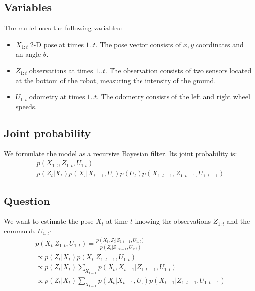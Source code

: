 \documentclass[letterpaper, 10pt, conference]{ieeeconf}
\begin{document}
\subsection{Variables}

The model uses the following variables:
\begin{itemize}
\item $X_{1:t}$ 2-D pose at times $1..t$.
The pose vector consists of $x,y$ coordinates and an angle $\theta$.
\item $Z_{1:t}$ observations at times $1..t$.
The observation consists of two sensors located at the bottom of the robot, measuring the intensity of the ground.
\item $U_{1:t}$ odometry at times $1..t$.
The odometry consists of the left and right wheel speeds.
\end{itemize}

\subsection{Joint probability}

We formulate the model as a recursive Bayesian filter.
Its joint probability is:
\begin{equation}
\begin{split}
& p(X_{1:t}, Z_{1:t}, U_{1:t}) = \\
& p(Z_t|X_t) p(X_t|X_{t-1}, U_{t}) p(U_t) p(X_{1:t-1}, Z_{1:t-1}, U_{1:t-1})
\end{split}
\end{equation}

\subsection{Question}

We want to estimate the pose $X_t$ at time $t$ knowing the observations $Z_{1:t}$ and the commands $U_{1:t}$:
\begin{equation}
\begin{split}
& p(X_t|Z_{1:t},U_{1:t}) = \frac{p(X_t,Z_t | Z_{1:t-1}, U_{1:t})}{p(Z_t|Z_{1:t-1}, U_{1:t})} \\
 &\propto p(Z_t | X_t) p(X_t | Z_{1:t-1}, U_{1:t}) \\
 &\propto p(Z_t | X_t) \sum_{X_{t-1}} p(X_t, X_{t-1} | Z_{1:t-1}, U_{1:t} ) \\
 &\propto p(Z_t | X_t) \sum_{X_{t-1}} p(X_t|X_{t-1}, U_t) p(X_{t-1} | Z_{1:t-1}, U_{1:t-1})
\end{split}
\end{equation}
\end{document}
